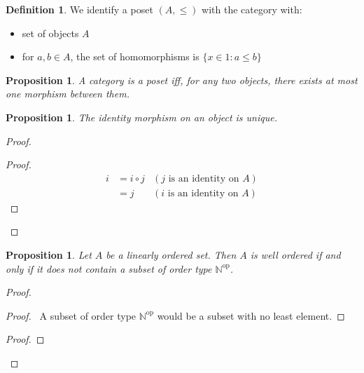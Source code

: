 \documentclass{book}
\let\qed\relax
\newtheorem{prop}[ax]{Proposition}
\theoremstyle{definition}
\newtheorem{df}[ax]{Definition}
\begin{document}
\begin{df}
We identify a poset $(A, \leq)$ with the category with:
\begin{itemize}
\item set of objects $A$
\item for $a,b \in A$, the set of homomorphisms is $\{ x \in 1 : a \leq b \}$
\end{itemize}
\end{df}

\begin{prop}
A category is a poset iff, for any two objects, there exists at most one morphism between them.
\end{prop}

\begin{prop}
The identity morphism on an object is unique.
\end{prop}

\begin{proof}
\pf
{}
\begin{proof}
	\pf
	\begin{align*}
		i & = i \circ j & (j \text{ is an identity on } A) \\
		& = j & (i \text{ is an identity on } A)
	\end{align*}
\end{proof}
\qed
\end{proof}

\begin{prop}
Let $A$ be a linearly ordered set. Then $A$ is well ordered if and only if it does not contain a subset of order type $\mathbb{N}^\mathrm{op}$.
\end{prop}

\begin{proof}
\pf
{}
\begin{proof}
	\pf\ A subset of order type $\mathbb{N}^\mathrm{op}$ would be a subset with no least element.
\end{proof}
\begin{proof}
\end{proof}
\qed
\end{proof}
\end{document}
